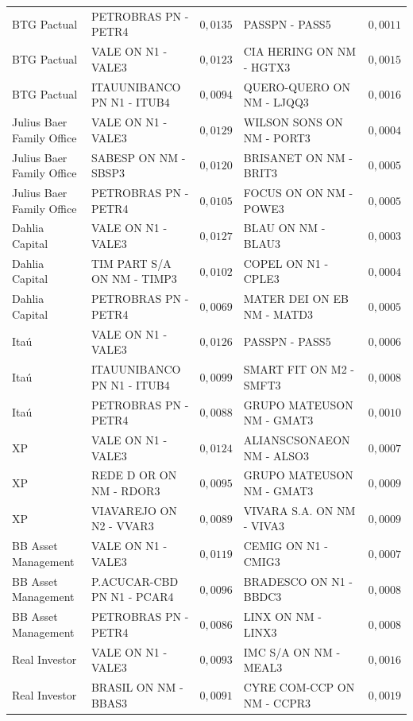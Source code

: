 \documentclass[11pt,a4paper]{article}
\begin{document}
\begin{center}
\begin{longtable}{@{}lp{3.9cm}rp{3.9cm}r@{}}
BTG Pactual & PETROBRAS PN - PETR4 & $0{,}0135$ & PASSPN - PASS5 & $0{,}0011$ \\
BTG Pactual & VALE ON N1 - VALE3 & $0{,}0123$ & CIA HERING ON NM - HGTX3 & $0{,}0015$ \\
BTG Pactual & ITAUUNIBANCO PN N1 - ITUB4 & $0{,}0094$ & QUERO-QUERO ON NM - LJQQ3 & $0{,}0016$ \\
Julius Baer Family Office & VALE ON N1 - VALE3 & $0{,}0129$ & WILSON SONS ON NM - PORT3 & $0{,}0004$ \\
Julius Baer Family Office & SABESP ON NM - SBSP3 & $0{,}0120$ & BRISANET ON NM - BRIT3 & $0{,}0005$ \\
Julius Baer Family Office & PETROBRAS PN - PETR4 & $0{,}0105$ & FOCUS ON ON NM - POWE3 & $0{,}0005$ \\
Dahlia Capital & VALE ON N1 - VALE3 & $0{,}0127$ & BLAU ON NM - BLAU3 & $0{,}0003$ \\
Dahlia Capital & TIM PART S/A ON NM - TIMP3 & $0{,}0102$ & COPEL ON N1 - CPLE3 & $0{,}0004$ \\
Dahlia Capital & PETROBRAS PN - PETR4 & $0{,}0069$ & MATER DEI ON EB NM - MATD3 & $0{,}0005$ \\
Itaú & VALE ON N1 - VALE3 & $0{,}0126$ & PASSPN - PASS5 & $0{,}0006$ \\
Itaú & ITAUUNIBANCO PN N1 - ITUB4 & $0{,}0099$ & SMART FIT ON M2 - SMFT3 & $0{,}0008$ \\
Itaú & PETROBRAS PN - PETR4 & $0{,}0088$ & GRUPO MATEUSON NM - GMAT3 & $0{,}0010$ \\
XP & VALE ON N1 - VALE3 & $0{,}0124$ & ALIANSCSONAEON NM - ALSO3 & $0{,}0007$ \\
XP & REDE D OR ON NM - RDOR3 & $0{,}0095$ & GRUPO MATEUSON NM - GMAT3 & $0{,}0009$ \\
XP & VIAVAREJO ON N2 - VVAR3 & $0{,}0089$ & VIVARA S.A. ON NM - VIVA3 & $0{,}0009$ \\
BB Asset Management & VALE ON N1 - VALE3 & $0{,}0119$ & CEMIG ON N1 - CMIG3 & $0{,}0007$ \\
BB Asset Management & P.ACUCAR-CBD PN N1 - PCAR4 & $0{,}0096$ & BRADESCO ON N1 - BBDC3 & $0{,}0008$ \\
BB Asset Management & PETROBRAS PN - PETR4 & $0{,}0086$ & LINX ON NM - LINX3 & $0{,}0008$ \\
Real Investor & VALE ON N1 - VALE3 & $0{,}0093$ & IMC S/A ON NM - MEAL3 & $0{,}0016$ \\
Real Investor & BRASIL ON NM - BBAS3 & $0{,}0091$ & CYRE COM-CCP ON NM - CCPR3 & $0{,}0019$ \\

\end{longtable}
\end{center}
\end{document}
